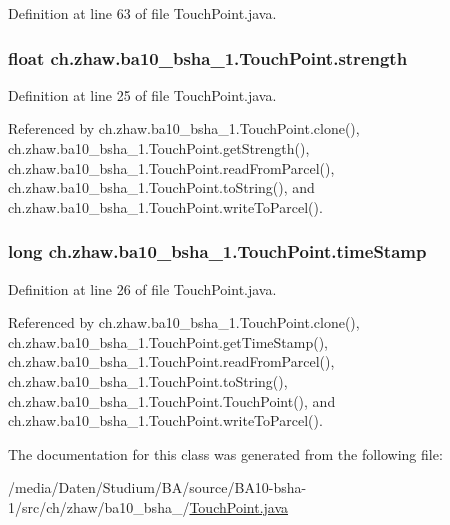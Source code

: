 Definition at line 63 of file TouchPoint.java.\hypertarget{classch_1_1zhaw_1_1ba10__bsha__1_1_1TouchPoint_ad245f48693fecee2b25f3c5e7e1976a8}{
\subsubsection[{strength}]{\setlength{\rightskip}{0pt plus 5cm}float {\bf ch.zhaw.ba10\_\-bsha\_\-1.TouchPoint.strength}}}
\label{classch_1_1zhaw_1_1ba10__bsha__1_1_1TouchPoint_ad245f48693fecee2b25f3c5e7e1976a8}


Definition at line 25 of file TouchPoint.java.

Referenced by ch.zhaw.ba10\_\-bsha\_\-1.TouchPoint.clone(), ch.zhaw.ba10\_\-bsha\_\-1.TouchPoint.getStrength(), ch.zhaw.ba10\_\-bsha\_\-1.TouchPoint.readFromParcel(), ch.zhaw.ba10\_\-bsha\_\-1.TouchPoint.toString(), and ch.zhaw.ba10\_\-bsha\_\-1.TouchPoint.writeToParcel().\hypertarget{classch_1_1zhaw_1_1ba10__bsha__1_1_1TouchPoint_aa0b6bef79c301e7ef664dd21045b517d}{
\subsubsection[{timeStamp}]{\setlength{\rightskip}{0pt plus 5cm}long {\bf ch.zhaw.ba10\_\-bsha\_\-1.TouchPoint.timeStamp}}}
\label{classch_1_1zhaw_1_1ba10__bsha__1_1_1TouchPoint_aa0b6bef79c301e7ef664dd21045b517d}


Definition at line 26 of file TouchPoint.java.

Referenced by ch.zhaw.ba10\_\-bsha\_\-1.TouchPoint.clone(), ch.zhaw.ba10\_\-bsha\_\-1.TouchPoint.getTimeStamp(), ch.zhaw.ba10\_\-bsha\_\-1.TouchPoint.readFromParcel(), ch.zhaw.ba10\_\-bsha\_\-1.TouchPoint.toString(), ch.zhaw.ba10\_\-bsha\_\-1.TouchPoint.TouchPoint(), and ch.zhaw.ba10\_\-bsha\_\-1.TouchPoint.writeToParcel().

The documentation for this class was generated from the following file:\begin{DoxyCompactItemize}
\item 
/media/Daten/Studium/BA/source/BA10-\/bsha-\/1/src/ch/zhaw/ba10\_\-bsha\_/\hyperlink{TouchPoint_8java}{TouchPoint.java}\end{DoxyCompactItemize}

